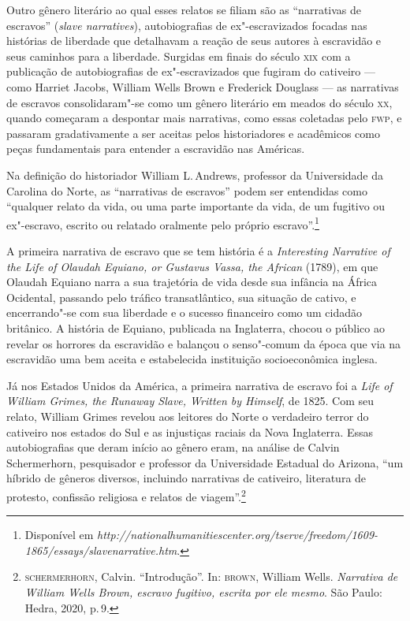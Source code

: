 Outro gênero literário ao qual esses relatos se filiam são as ``narrativas de escravos''
(\textit{slave narratives}), autobiografias de ex"-escravizados focadas nas histórias de liberdade que detalhavam a reação de seus autores à escravidão e seus caminhos para a liberdade. Surgidas em finais do século \textsc{xix} com a publicação de autobiografias de ex"-escravizados que fugiram do cativeiro --- como Harriet Jacobs, William Wells Brown e Frederick Douglass --- as narrativas de escravos consolidaram"-se como um gênero literário em meados do século \textsc{xx}, quando começaram a despontar mais narrativas, como essas coletadas pelo \textsc{fwp}, e passaram gradativamente a ser aceitas pelos historiadores e acadêmicos como peças fundamentais para entender a escravidão nas Américas.

Na definição do historiador William L.\,Andrews, professor da Universidade da Carolina do Norte, as ``narrativas de escravos'' podem ser entendidas como ``qualquer relato da vida, ou uma parte importante da vida, de um fugitivo ou ex"-escravo, escrito ou relatado oralmente pelo próprio escravo''.\footnote{Disponível em \emph{http://nationalhumanitiescenter.org/tserve/freedom/1609-1865/essays/slavenarrative.htm}.}


A primeira narrativa de escravo que se tem história é a 
\textit{Interesting Narrative of the Life of Olaudah Equiano, or Gustavus Vassa, the African}
(1789), em que Olaudah Equiano narra a sua trajetória de vida desde sua infância na África Ocidental, passando pelo tráfico transatlântico, sua situação de cativo, e encerrando"-se com sua liberdade e o sucesso financeiro como um cidadão britânico.
A história de Equiano, publicada na Inglaterra, chocou o público ao revelar os horrores da escravidão e balançou o senso"-comum da época que via na escravidão uma bem aceita e estabelecida instituição socioeconômica inglesa.

Já nos Estados Unidos da América, a primeira narrativa de escravo foi a \emph{Life of William Grimes, the Runaway Slave, Written by Himself}, de 1825.
Com seu relato, William Grimes revelou aos leitores do Norte o verdadeiro terror do cativeiro nos estados do Sul e as injustiças raciais da Nova Inglaterra.
Essas autobiografias que deram início ao gênero eram, na análise de Calvin Schermerhorn, pesquisador e professor da Universidade Estadual do Arizona,
``um híbrido de gêneros diversos, incluindo narrativas de cativeiro, literatura de protesto, confissão religiosa e relatos de viagem''.\footnote{\textsc{schermerhorn}, Calvin. ``Introdução''. In: \textsc{brown}, William Wells. \textit{Narrativa de William Wells Brown,
escravo fugitivo, escrita por ele mesmo}. São Paulo: Hedra, 2020, p.\,9.}

